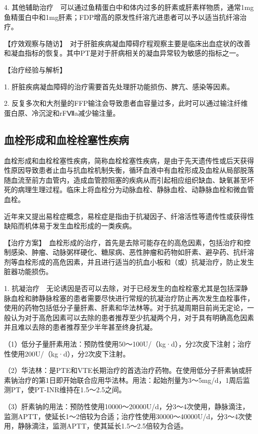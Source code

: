 4.
其他辅助治疗　可以通过鱼精蛋白中和体内过多的肝素或肝素样物质，通常1mg鱼精蛋白中和1mg肝素；FDP增高的原发性纤溶亢进患者可以予以适当抗纤溶治疗。

【疗效观察与随访】　对于肝脏疾病凝血障碍疗程观察主要是临床出血症状的改善和凝血指标的恢复。其中PT是对于肝病相关的凝血异常较为敏感的指标之一。

【治疗经验与解析】

1. 肝脏疾病凝血障碍的治疗需要首先处理肝功能损伤、脾亢、感染等因素。

2.
反复多次和大剂量的FFP输注会导致患者血容量过多，此时可以通过输注纤维蛋白原、冷沉淀和rFⅦa减少输注量。

\subsection{血栓形成和血栓栓塞性疾病}

血栓形成和血栓栓塞性疾病，简称血栓栓塞性疾病，是由于先天遗传性或后天获得性原因导致患者止血与抗血栓机制失衡，循环血液中有血栓形成及血栓从局部脱落随血流至前方血管内，造成血管腔阻塞的疾病从而引起相应组织缺血、缺氧甚至坏死的病理生理过程。临床上将血栓分为动脉血栓、静脉血栓、动静脉血栓和微血管血栓。

近年来又提出易栓症概念，易栓症是指由于抗凝因子、纤溶活性等遗传性或获得性缺陷而机体易于发生血栓形成的一类疾病。

【治疗方案】　血栓形成的治疗，首先是去除可能存在的高危因素，包括治疗和控制感染、肿瘤、动脉粥样硬化、糖尿病、恶性肿瘤和药物如肝素、避孕药、抗纤溶剂等血栓形成的高危因素，并且进行适当的抗血小板和（或）抗凝治疗，防止发生脏器功能损伤。

1.
抗凝治疗　无论诱因是否可以去除，对于已经发生的血栓栓塞尤其是包括深静脉血栓和肺静脉栓塞的患者需要尽快进行常规的抗凝治疗防止再次发生血栓事件，使用的药物包括低分子量肝素、肝素和华法林等。对于抗凝周期目前尚无定论，一般认为对于高危因素可以去除的患者推荐至少抗凝两个月，对于具有明确高危因素并且难以去除的患者推荐至少半年甚至终身抗凝。

（1）低分子量肝素用法：预防性使用50～100U/（kg·d），分2次皮下注射；治疗性使用200U/（kg·d），分2次皮下注射。

（2）华法林：是PTE和VTE长期治疗的首选治疗药物。在使用低分子肝素钠或肝素钠治疗的第1日即开始联合应用华法林。用法：起始剂量为3～5mg/d，1周后监测PT，使PT-INR维持在1.5～2.5之间。

（3）肝素钠的用法：预防性使用10000～20000U/d，分3～4次使用，静脉滴注，监测APTT，使延长1～2倍较为合适；治疗性使用30000～40000U/d，分3～4次使用，静脉滴注，监测APTT，使其延长1.5～2.5倍较为合适。

